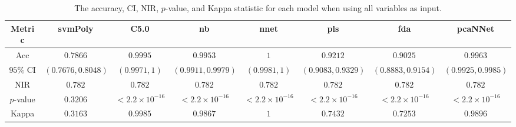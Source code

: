 \begin{table}[!ht]
	\centering
	\begin{tabular}{|c|c|c|c|c|c|c|c|}
		\hline
		Metric & svmPoly & C5.0 & nb & nnet & pls & fda & pcaNNet \\ \hline
		Acc & $0.7866$ & $0.9995$ & $0.9953$ & $1$ & $0.9212$ & $0.9025$ & $0.9963$ \\ \hline
		$95\%$ CI & $(0.7676, 0.8048)$ & $(0.9971, 1)$ & $(0.9911, 0.9979)$ & $(0.9981, 1)$ & $(0.9083, 0.9329)$ & $(0.8883, 0.9154)$ & $(0.9925, 0.9985)$ \\ \hline
		NIR & $0.782$ & $0.782$ & $0.782$ & $0.782$ & $0.782$ & $0.782$ & $0.782$ \\ \hline
		$p$-value & $0.3206$ & $< 2.2 \times {10}^{-16}$ & $< 2.2 \times {10}^{-16}$ & $< 2.2 \times {10}^{-16}$ & $< 2.2 \times {10}^{-16}$ & $< 2.2 \times {10}^{-16}$ & $< 2.2 \times {10}^{-16}$ \\ \hline
		Kappa & $0.3163$ & $0.9985$ & $0.9867$ & $1$ & $0.7432$ & $0.7253$ & $0.9896$ \\ \hline
	\end{tabular}
	\caption{The accuracy, CI, NIR, $p$-value, and Kappa statistic for each model when using all variables as input.}
	\label{tab:stats:all}
\end{table}
